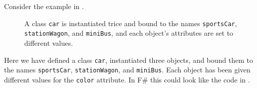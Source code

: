 Consider the example in .
\begin{figure}[h]
  \centering
  \caption{A class \lstinline{car} is instantiated trice and bound to the names \lstinline{sportsCar}, \lstinline{stationWagon}, and \lstinline{miniBus}, and each object's attributes are set to different values.}
  \label{fig:instantiation}
\end{figure}
Here we have defined a class \lstinline{car}, instantiated three objects, and bound them to the names \lstinline{sportsCar}, \lstinline{stationWagon}, and \lstinline{miniBus}. Each object has been given different values for the \lstinline{color} attribute. In F\# this could look like the code in .
%
%
%
